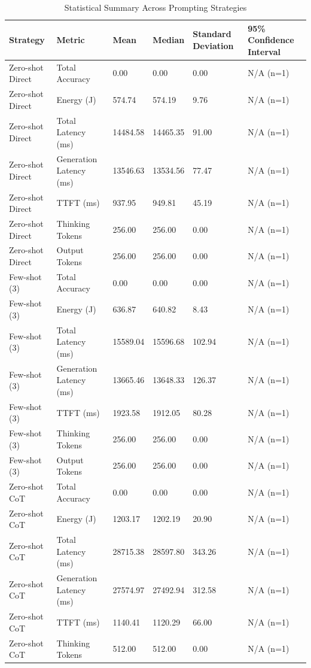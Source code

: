 \begin{table}
\caption{Statistical Summary Across Prompting Strategies}
\label{tab:statistical_summary}
\begin{tabular}{llllll}
\toprule
Strategy & Metric & Mean & Median & Standard Deviation & 95\% Confidence Interval \\
\midrule
Zero-shot Direct & Total Accuracy & 0.00 & 0.00 & 0.00 & N/A (n=1) \\
Zero-shot Direct & Energy (J) & 574.74 & 574.19 & 9.76 & N/A (n=1) \\
Zero-shot Direct & Total Latency (ms) & 14484.58 & 14465.35 & 91.00 & N/A (n=1) \\
Zero-shot Direct & Generation Latency (ms) & 13546.63 & 13534.56 & 77.47 & N/A (n=1) \\
Zero-shot Direct & TTFT (ms) & 937.95 & 949.81 & 45.19 & N/A (n=1) \\
Zero-shot Direct & Thinking Tokens & 256.00 & 256.00 & 0.00 & N/A (n=1) \\
Zero-shot Direct & Output Tokens & 256.00 & 256.00 & 0.00 & N/A (n=1) \\
Few-shot (3) & Total Accuracy & 0.00 & 0.00 & 0.00 & N/A (n=1) \\
Few-shot (3) & Energy (J) & 636.87 & 640.82 & 8.43 & N/A (n=1) \\
Few-shot (3) & Total Latency (ms) & 15589.04 & 15596.68 & 102.94 & N/A (n=1) \\
Few-shot (3) & Generation Latency (ms) & 13665.46 & 13648.33 & 126.37 & N/A (n=1) \\
Few-shot (3) & TTFT (ms) & 1923.58 & 1912.05 & 80.28 & N/A (n=1) \\
Few-shot (3) & Thinking Tokens & 256.00 & 256.00 & 0.00 & N/A (n=1) \\
Few-shot (3) & Output Tokens & 256.00 & 256.00 & 0.00 & N/A (n=1) \\
Zero-shot CoT & Total Accuracy & 0.00 & 0.00 & 0.00 & N/A (n=1) \\
Zero-shot CoT & Energy (J) & 1203.17 & 1202.19 & 20.90 & N/A (n=1) \\
Zero-shot CoT & Total Latency (ms) & 28715.38 & 28597.80 & 343.26 & N/A (n=1) \\
Zero-shot CoT & Generation Latency (ms) & 27574.97 & 27492.94 & 312.58 & N/A (n=1) \\
Zero-shot CoT & TTFT (ms) & 1140.41 & 1120.29 & 66.00 & N/A (n=1) \\
Zero-shot CoT & Thinking Tokens & 512.00 & 512.00 & 0.00 & N/A (n=1) \\

\end{tabular}
\end{table}
